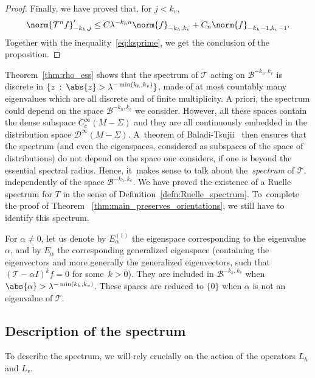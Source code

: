 \documentclass[JEP,XML,SOM,Unicode]{cedram}
\newcommand{\boB}{\mathcal{B}}
\newcommand{\boD}{\mathcal{D}}
\newcommand{\boT}{\mathcal{T}}
\newcommand{\st}{\::\:}
\theoremstyle{definition}
\numberwithin{equation}{section}
\begin{document}
\begin{proof}
Finally, we have proved that, for $j < k_v$,
\begin{equation*}
\norm{\boT^n f}'_{-k_h, j} \leq C \lambda^{-k_h n} \norm{f}_{-k_h, k_v} + C_n \norm{f}_{-k_h-1, k_v-1}.
\end{equation*}
Together with the inequality~\eqref{eq:ksprime}, we get the conclusion of the
proposition.
\end{proof}

Theorem~\ref{thm:rho_ess} shows that the spectrum of $\boT$ acting on
$\boB^{-k_h, k_v}$ is discrete in \hbox{$\{z \st \abs{z} > \lambda^{-\min(k_h,
k_v)}\}$}, made of at most countably many eigenvalues which are all discrete
and of finite multiplicity. A priori, the spectrum could depend on the space
$\boB^{-k_h, k_v}$ we consider. However, all these spaces contain the dense
subspace $C^\infty_c(M-\Sigma)$ and they are all continuously embedded in the
distribution space $\boD^\infty(M-\Sigma)$. A~theorem of
Baladi-Tsujii~\cite[Lem.\,A.1]{bt_zeta} then ensures that the spectrum (and
even the eigenspaces, considered as subspaces of the space of distributions)
do not depend on the space one considers, if one is beyond the essential
spectral radius. Hence, it~makes sense to talk about the~\emph{spectrum} of
$\boT$, independently of the space $\boB^{-k_h, k_v}$. We have proved the
existence of a Ruelle spectrum for $T$ in the sense of
Definition~\ref{defn:Ruelle_spectrum}. To~complete the proof of Theorem
~\ref{thm:main_preserves_orientations}, we still have to identify this
spectrum.

For $\alpha \neq 0$, let us denote by $E_\alpha^{(1)}$ the eigenspace
corresponding to the eigenvalue~$\alpha$, and by $E_\alpha$ the corresponding
generalized eigenspace (containing the eigenvectors and more generally the
generalized eigenvectors, \ie such that $(\boT -\alpha I)^k f = 0$ for some~\hbox{$k > 0$}). They are included in $\boB^{-k_h, k_v}$ when $\abs{\alpha}
> \lambda^{-\min(k_h, k_v)}$. These spaces are reduced to $\{0\}$ when
$\alpha$ is not an eigenvalue of $\boT$.

\subsection{Description of the spectrum}

To describe the spectrum, we will rely crucially on the action of the
operators $L_h$ and $L_v$.
\end{document}
